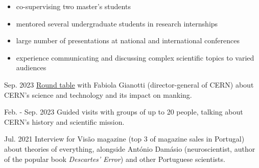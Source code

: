 
\begin{itemize}
    \item co-supervising two master's students
    \item mentored several undergraduate students in research internships
    \item large number of presentations at national and international conferences
    \item experience communicating and discussing complex scientific topics to varied audiences
\end{itemize}


\begin{cventries}

{}{Sep. 2023}
{\href{https://www.cienciaviva.pt/divulgacao-cientifica/o-bosao-de-higgs-e-as-nossas-vidas}{Round table} with Fabiola Gianotti (director-general of CERN) about CERN's science and technology and its impact on manking.}

{}{Feb. - Sep. 2023}
{Guided visits with groups of up to 20 people, talking about CERN's history and scientific mission.}    

{}{Jul. 2021}
{Interview for Visão magazine (top 3 of magazine sales in Portugal) about theories of everything, alongside António Damásio (neuroscientist, author of the popular book \textit{Descartes' Error}) and other Portuguese scientists.}

\end{cventries}
